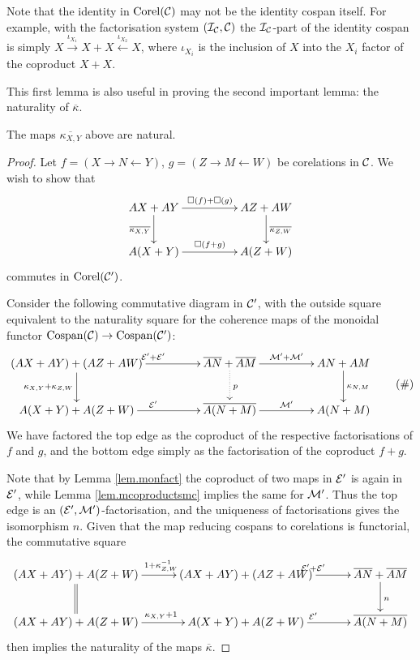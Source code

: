 Note that the identity in $\operatorname{{Corel}}(\mathcal C)$ may not be the identity cospan itself.
For example, with the factorisation system $(\mathcal I_{\mathcal C}, \mathcal C)$ the $\mathcal
I_{\mathcal C}$-part of the identity cospan is simply $X \stackrel{\iota_{X_1}}\to
X+X \stackrel{\iota_{X_2}}\leftarrow X$, where $\iota_{X_i}$ is the inclusion of
$X$ into the $X_i$ factor of the coproduct $X+X$.

This first lemma is also useful in proving the second important lemma: the
naturality of $\overline{\kappa}$.

\begin{lemma} \label{lem.corelfunmonoidal}
  The maps $\overline{\kappa_{X,Y}}$ above are natural.
\end{lemma}
\begin{proof}
  Let $f = (X \longrightarrow N \longleftarrow Y)$, $g= (Z \longrightarrow M
  \longleftarrow W)$ be corelations in $\mathcal C$. We wish to show that
  \[
      \xymatrixcolsep{4pc}
      \xymatrixrowsep{2pc}
    \xymatrix{
      AX+AY \ar[r]^{\square(f)+\square(g)}
      \ar[d]_{\overline{\kappa_{X,Y}}} & 
      AZ+AW \ar[d]^{\overline{\kappa_{Z,W}}} \\
      A(X+Y) \ar[r]^{\square(f+g)} & A(Z+W)
    }
  \]
  commutes in $\operatorname{{Corel}}(\mathcal C')$. 
  
  Consider the following commutative diagram in $\mathcal C'$, with the outside
  square equivalent to the naturality square for the coherence maps of the
  monoidal functor $\operatorname{{Cospan}}(\mathcal C) \to \operatorname{{Cospan}}(\mathcal C')$:
  \[ \label{diag.natural}
    \begin{aligned}
      \xymatrixcolsep{4pc}
      \xymatrixrowsep{2pc}
    \xymatrix{
      (AX+AY)+(AZ+AW) \ar[r]^{\mc E'+\mc E'} \ar[d]_{\kappa_{X,Y}+\kappa_{Z,W}} & 
      \overline{AN}+\overline{AM} \ar[r]^{\mc M'+\mc M'} \ar@{.>}[d]^{p} & 
      AN+AM \ar[d]^{\kappa_{N,M}}\\
      A(X+Y)+A(Z+W) \ar[r]^{\mc E'} & \overline{A(N+M)} \ar[r]^{\mc M'} & A(N+M)
    }
  \end{aligned}
    \tag{$\#$}
  \]
  We have factored the top edge as the coproduct of the respective
  factorisations of $f$ and $g$, and the bottom edge simply as the factorisation
  of the coproduct $f+g$. 
  
  Note that by Lemma \ref{lem.monfact} the coproduct of two maps in $\mathcal E'$ is
  again in $\mathcal E'$, while Lemma \ref{lem.mcoproductsmc} implies the same for
  $\mathcal M'$. Thus the top edge is an $(\mathcal E',\mathcal M')$-factorisation, and the
  uniqueness of factorisations gives the isomorphism $n$. 
  Given that the map reducing cospans to corelations is functorial, the
  commutative square
  \[
      \xymatrixcolsep{2.5pc}
      \xymatrixrowsep{2pc}
    \xymatrix{
      (AX+AY)+A(Z+W) \ar[r]^{1+\kappa_{Z,W}^{-1}} \ar@{=}[d] & (AX+AY)+(AZ+AW)
      \ar[r]^{\mc E'+\mc E'} & 
      \overline{AN}+\overline{AM} \ar[d]^{n} \\
      (AX+AY)+A(Z+W) \ar[r]^{\kappa_{X,Y}+1} & A(X+Y)+A(Z+W) \ar[r]^{\mc E'} & 
      \overline{A(N+M)}
    }
  \]
  then implies the naturality of the maps $\overline{\kappa}$.
\end{proof}

